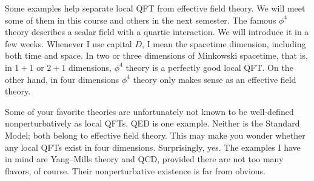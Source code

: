 Some examples help separate local QFT from effective field theory. We will meet
some of them in this course and others in the next semester.
The famous $\phi^4$ theory describes a scalar field with a quartic interaction.
We will introduce it in a few weeks.
Whenever I use capital $D$, I mean the spacetime dimension, including both time
and space. In two or three dimensions of Minkowski spacetime,
that is, in $1+1$ or $2+1$ dimensions, $\phi^4$ theory is a perfectly good local
QFT.
On the other hand, in four dimensions $\phi^4$ theory only makes sense as an
effective field theory.

Some of your favorite theories are unfortunately not known to be well-defined
nonperturbatively as local QFTs. QED is one example.
Neither is the Standard Model; both belong to effective field theory. This may
make you wonder whether any local QFTs exist in four dimensions. Surprisingly,
yes.
The examples I have in mind are Yang--Mills theory and QCD, provided there are
not too many flavors, of course. Their nonperturbative existence is far from
obvious.

